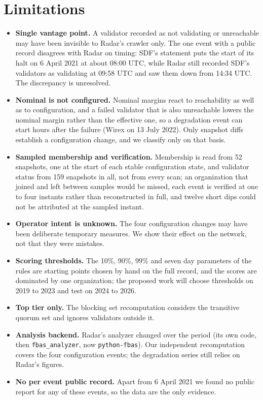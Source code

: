 \documentclass[11pt,a4paper]{article}
\newcommand{\toolname}[1]{\texttt{#1}}
\begin{document}
\section{Limitations}
\begin{itemize}
\item \textbf{Single vantage point.} A validator recorded as not validating or unreachable may have been invisible to Radar's crawler only. The one event with a public record disagrees with Radar on timing: SDF's statement puts the start of its halt on 6 April 2021 at about 08:00 UTC, while Radar still recorded SDF's validators as validating at 09:58 UTC and saw them down from 14:34 UTC. The discrepancy is unresolved.
\item \textbf{Nominal is not configured.} Nominal margins react to reachability as well as to configuration, and a failed validator that is also unreachable lowers the nominal margin rather than the effective one, so a degradation event can start hours after the failure (Wirex on 13 July 2022). Only snapshot diffs establish a configuration change, and we classify only on that basis.
\item \textbf{Sampled membership and verification.} Membership is read from 52 snapshots, one at the start of each stable configuration state, and validator status from 159 snapshots in all, not from every scan; an organization that joined and left between samples would be missed, each event is verified at one to four instants rather than reconstructed in full, and twelve short dips could not be attributed at the sampled instant.
\item \textbf{Operator intent is unknown.} The four configuration changes may have been deliberate temporary measures. We show their effect on the network, not that they were mistakes.
\item \textbf{Scoring thresholds.} The 10\%, 90\%, 99\% and seven day parameters of the rules are starting points chosen by hand on the full record, and the scores are dominated by one organization; the proposed work will choose thresholds on 2019 to 2023 and test on 2024 to 2026.
\item \textbf{Top tier only.} The blocking set recomputation considers the transitive quorum set and ignores validators outside it.
\item \textbf{Analysis backend.} Radar's analyzer changed over the period (its own code, then \toolname{fbas\_analyzer}, now \toolname{python-fbas}). Our independent recomputation covers the four configuration events; the degradation series still relies on Radar's figures.
\item \textbf{No per event public record.} Apart from 6 April 2021 we found no public report for any of these events, so the data are the only evidence.
\end{itemize}
\end{document}
